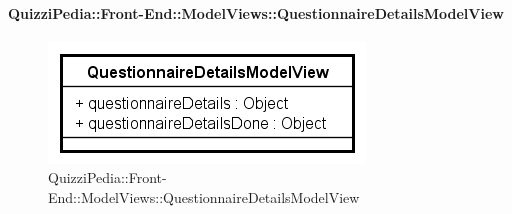 \paragraph{QuizziPedia::Front-End::ModelViews::QuestionnaireDetailsModelView}
	
	\label{QuizziPedia::Front-End::ModelViews::QuestionnaireDetailsModelView}
	
	\begin{figure}[ht]
		\centering
		\includegraphics[scale=0.5,keepaspectratio]{UML/Classi/Front-End/QuizziPedia_Front-end_ModelView_QuestionnaireDetailsModelView.png}
		\caption{QuizziPedia::Front-End::ModelViews::QuestionnaireDetailsModelView}
	\end{figure} \FloatBarrier
	
